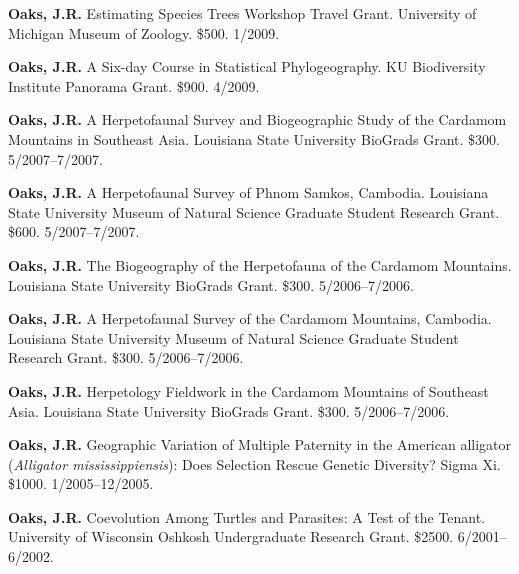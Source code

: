 \myHangIndent
\textbf{Oaks, J.R.}
Estimating Species Trees Workshop Travel Grant.
University of Michigan Museum of Zoology.
\$500.
1/2009.

\myHangIndent
\textbf{Oaks, J.R.}
A Six-day Course in Statistical Phylogeography.
KU Biodiversity Institute Panorama Grant.
\$900.
4/2009.

\myHangIndent
\textbf{Oaks, J.R.}
A Herpetofaunal Survey and Biogeographic Study of the Cardamom Mountains in
Southeast Asia.
Louisiana State University BioGrads Grant.
\$300.
5/2007--7/2007.

\myHangIndent
\textbf{Oaks, J.R.}
A Herpetofaunal Survey of Phnom Samkos, Cambodia.
Louisiana State University Museum of Natural Science Graduate Student Research
Grant.
\$600.
5/2007--7/2007.

\myHangIndent
\textbf{Oaks, J.R.}
The Biogeography of the Herpetofauna of the Cardamom Mountains.
Louisiana State University BioGrads Grant.
\$300.
5/2006--7/2006.

\myHangIndent
\textbf{Oaks, J.R.}
A Herpetofaunal Survey of the Cardamom Mountains, Cambodia.
Louisiana State University Museum of Natural Science Graduate Student Research
Grant.
\$300.
5/2006--7/2006.

\myHangIndent
\textbf{Oaks, J.R.}
Herpetology Fieldwork in the Cardamom Mountains of Southeast Asia.
Louisiana State University BioGrads Grant.
\$300.
5/2006--7/2006.

\myHangIndent
\textbf{Oaks, J.R.}
Geographic Variation of Multiple Paternity in the American alligator
(\emph{Alligator mississippiensis}): Does Selection Rescue Genetic Diversity?
Sigma Xi.
\$1000.
1/2005--12/2005.

\myHangIndent
\textbf{Oaks, J.R.}
Coevolution Among Turtles and Parasites: A Test of the Tenant.
University of Wisconsin Oshkosh Undergraduate Research Grant.
\$2500.
6/2001--6/2002.
